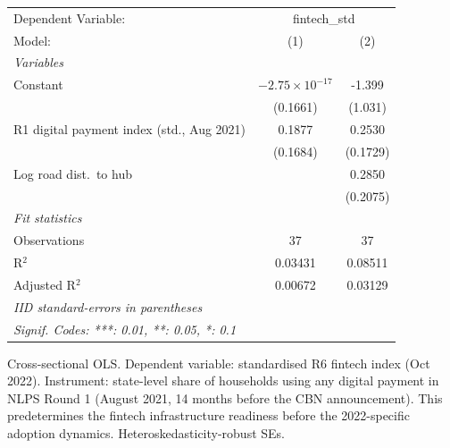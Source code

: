 
\begingroup
\centering
\begin{tabular}{lcc}
   \tabularnewline \midrule \midrule
   Dependent Variable: & \multicolumn{2}{c}{fintech\_std}\\
   Model:                                    & (1)                     & (2)\\  
   \midrule
   \emph{Variables}\\
   Constant                                  & $-2.75\times 10^{-17}$  & -1.399\\   
                                             & (0.1661)                & (1.031)\\   
   R1 digital payment index (std., Aug 2021) & 0.1877                  & 0.2530\\   
                                             & (0.1684)                & (0.1729)\\   
   Log road dist.\ to hub                    &                         & 0.2850\\   
                                             &                         & (0.2075)\\   
   \midrule
   \emph{Fit statistics}\\
   Observations                              & 37                      & 37\\  
   R$^2$                                     & 0.03431                 & 0.08511\\  
   Adjusted R$^2$                            & 0.00672                 & 0.03129\\  
   \midrule \midrule
   \multicolumn{3}{l}{\emph{IID standard-errors in parentheses}}\\
   \multicolumn{3}{l}{\emph{Signif. Codes: ***: 0.01, **: 0.05, *: 0.1}}\\
\end{tabular}
 
\par \raggedright 
Cross-sectional OLS. Dependent variable: standardised R6 fintech index (Oct 2022). Instrument: state-level share of households using any digital payment in NLPS Round 1 (August 2021, 14 months before the CBN announcement). This predetermines the fintech infrastructure readiness before the 2022-specific adoption dynamics. Heteroskedasticity-robust SEs.
\par\endgroup


